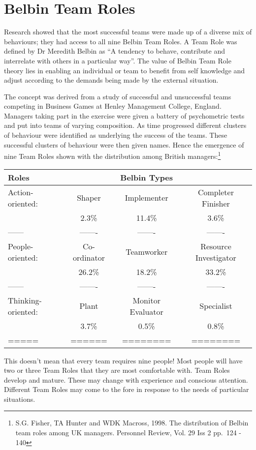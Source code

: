 \documentclass[]{book}
\let\rmarkdownfootnote\footnote%
\def\footnote{\protect\rmarkdownfootnote}
\begin{document}
\hypertarget{belbin-team-roles}{%
\section{Belbin Team Roles}\label{belbin-team-roles}}

Research showed that the most successful teams were made up of a diverse mix of behaviours; they had access to all nine Belbin Team Roles. A Team Role was defined by Dr Meredith Belbin as ``A tendency to behave, contribute and interrelate with others in a particular way''. The value of Belbin Team Role theory lies in enabling an individual or team to benefit from self knowledge and adjust according to the demands being made by the external situation.

The concept was derived from a study of successful and unsuccessful teams competing in
Business Games at Henley Management College, England. Managers taking part in the exercise
were given a battery of psychometric tests and put into teams of varying composition. As time
progressed different clusters of behaviour were identified as underlying the success of the teams. These successful clusters of behaviour were then given names. Hence the emergence of nine Team Roles shown with the distribution among British managers:\footnote{S.G. Fisher, TA Hunter and WDK Macross, 1998. The distribution of Belbin team roles among UK managers. Personnel Review, Vol. 29 Iss 2 pp.~124 - 140}

\begin{longtable}[]{@{}lccc@{}}
\toprule
Roles & & Belbin Types &\tabularnewline
\midrule
\endhead
Action-oriented: & Shaper & Implementer & Completer Finisher\tabularnewline
& 2.3\% & 11.4\% & 3.6\%\tabularnewline
------ & ------- & ------- & -------\tabularnewline
People-oriented: & Co-ordinator & Teamworker & Resource Investigator\tabularnewline
& 26.2\% & 18.2\% & 33.2\%\tabularnewline
------ & ------- & ------- & -------\tabularnewline
Thinking-oriented: & Plant & Monitor Evaluator & Specialist\tabularnewline
& 3.7\% & 0.5\% & 0.8\%\tabularnewline
===== & ====== & ======== & ========\tabularnewline
\bottomrule
\end{longtable}

This doesn't mean that every team requires nine people! Most people will have two or three Team Roles that they are most comfortable with. Team Roles develop and mature. These may change with experience and conscious attention. Different Team Roles may come to the fore in response to the needs of particular situations.
\end{document}

